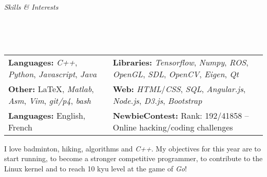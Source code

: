 \documentclass[a4paper, 12pt]{article}
\newcommand{\marginline}{-0.3cm}
\newcommand{\marginbeforesection}{0.25cm}
\newcommand{\marginmisc}{0.3cm}
\newcommand{\marginbeforemisc}{-0.75cm}
\newcommand{\linewidthperso}{0.02cm}
\newcommand{\stylesection}[1]{
  \vspace{\marginbeforesection}
  \begin{normalsize}\textit{#1}\end{normalsize}
  \vspace{\marginline}\\
  \noindent\makebox[\linewidth]{\rule{\textwidth}{\linewidthperso}}

}
\begin{document}
\begin{footnotesize}
\stylesection{Skills \& Interests}
~\\
\vspace{\marginbeforemisc}

\noindent\begin{tabular}{@{}p{7.15cm}p{12cm}}
  \textbf{Languages:} \textit{C++}, \textit{Python}, \textit{Javascript}, \textit{Java} & \textbf{Libraries:} \textit{Tensorflow}, \textit{Numpy}, \textit{ROS}, \textit{OpenGL}, \textit{SDL}, \textit{OpenCV}, \textit{Eigen}, \textit{Qt}\\
  \textbf{Other:} \LaTeX, \textit{Matlab}, \textit{Asm}, \textit{Vim}, \textit{git/p4}, \textit{bash} & \textbf{Web:} \textit{HTML}/\textit{CSS}, \textit{SQL}, \textit{Angular.js}, \textit{Node.js}, \textit{D3.js}, \textit{Bootstrap}\\
  \textbf{Languages:} English, French & \textbf{NewbieContest:} Rank: 192/41858 -- Online hacking/coding challenges\\
\end{tabular}

\vspace{\marginmisc}

\renewcommand{\baselinestretch}{0.8}
I love badminton, hiking, algorithms and \textit{C++}. My objectives for this year are to start running, to become a stronger competitive programmer, to contribute to the Linux kernel and to reach 10 kyu level at the game of \textit{Go}!

\end{footnotesize}
\end{document}
